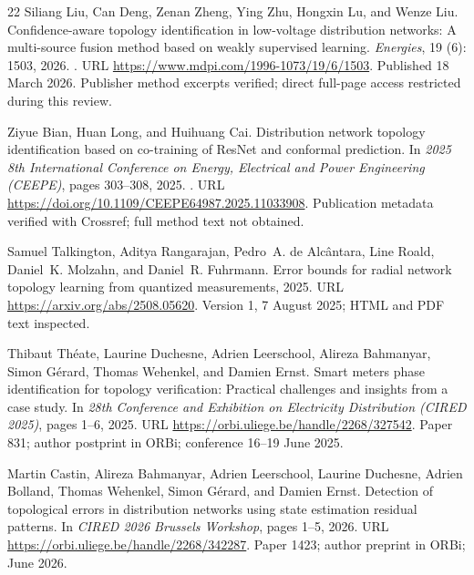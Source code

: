 \documentclass[UTF8,11pt,fontset=fandol]{ctexart}
\theoremstyle{remark}
\numberwithin{equation}{section}
\begin{document}
\begin{thebibliography}{22}
Siliang Liu, Can Deng, Zenan Zheng, Ying Zhu, Hongxin Lu, and Wenze Liu.
\newblock Confidence-aware topology identification in low-voltage distribution
  networks: A multi-source fusion method based on weakly supervised learning.
\newblock \emph{Energies}, 19 (6): 1503, 2026.
\newblock {}.
\newblock URL \url{https://www.mdpi.com/1996-1073/19/6/1503}.
\newblock Published 18 March 2026. Publisher method excerpts verified; direct
  full-page access restricted during this review.

Ziyue Bian, Huan Long, and Huihuang Cai.
\newblock Distribution network topology identification based on co-training of
  {ResNet} and conformal prediction.
\newblock In \emph{2025 8th International Conference on Energy, Electrical and
  Power Engineering (CEEPE)}, pages 303--308, 2025.
\newblock {}.
\newblock URL \url{https://doi.org/10.1109/CEEPE64987.2025.11033908}.
\newblock Publication metadata verified with Crossref; full method text not
  obtained.

Samuel Talkington, Aditya Rangarajan, Pedro~A. {de Alc{\^a}ntara}, Line Roald,
  Daniel~K. Molzahn, and Daniel~R. Fuhrmann.
\newblock Error bounds for radial network topology learning from quantized
  measurements, 2025.
\newblock URL \url{https://arxiv.org/abs/2508.05620}.
\newblock Version 1, 7 August 2025; HTML and PDF text inspected.

Thibaut Th{\'e}ate, Laurine Duchesne, Adrien Leerschool, Alireza Bahmanyar,
  Simon G{\'e}rard, Thomas Wehenkel, and Damien Ernst.
\newblock Smart meters phase identification for topology verification:
  Practical challenges and insights from a case study.
\newblock In \emph{28th Conference and Exhibition on Electricity Distribution
  (CIRED 2025)}, pages 1--6, 2025.
\newblock URL \url{https://orbi.uliege.be/handle/2268/327542}.
\newblock Paper 831; author postprint in ORBi; conference 16--19 June 2025.

Martin Castin, Alireza Bahmanyar, Adrien Leerschool, Laurine Duchesne, Adrien
  Bolland, Thomas Wehenkel, Simon G{\'e}rard, and Damien Ernst.
\newblock Detection of topological errors in distribution networks using state
  estimation residual patterns.
\newblock In \emph{CIRED 2026 Brussels Workshop}, pages 1--5, 2026.
\newblock URL \url{https://orbi.uliege.be/handle/2268/342287}.
\newblock Paper 1423; author preprint in ORBi; June 2026.


\end{thebibliography}
\end{document}
